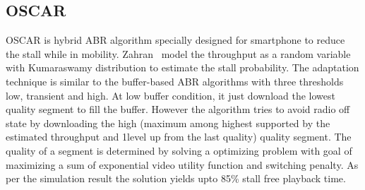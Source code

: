 \subsection{OSCAR}
OSCAR\cite{10.1145/2910018.2910655} is hybrid ABR algorithm specially designed for smartphone to reduce the stall while in mobility. Zahran \etal\ model the throughput as a random variable with Kumaraswamy distribution \cite{jones2009kumaraswamy} to estimate the stall probability. The adaptation technique is similar to the buffer-based ABR algorithms with three thresholds low, transient and high. At low buffer condition, it just download the lowest quality segment to fill the buffer. However the algorithm tries to avoid radio off state by downloading the high (maximum among highest supported by the estimated throughput and 1level up from the last quality) quality segment. The quality of a segment is determined by solving a optimizing problem with goal of maximizing a sum of exponential video utility function and switching penalty. As per the simulation result the solution yields upto 85\% stall free playback time.